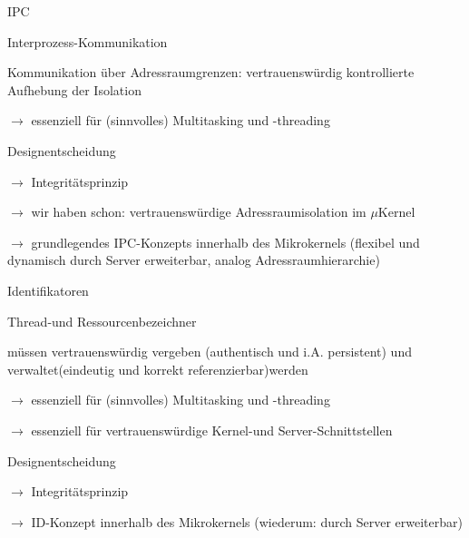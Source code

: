 \documentclass[a4paper]{article}
\begin{document}
\begin{multicols}{3}
    IPC

    \begin{itemize*}
        \item
        Interprozess-Kommunikation
        \begin{itemize*}
            \item Kommunikation über Adressraumgrenzen: vertrauenswürdig kontrollierte Aufhebung der Isolation
            \item $\rightarrow$  essenziell für (sinnvolles) Multitasking und -threading
        \end{itemize*}
        \item
        Designentscheidung
        \begin{itemize*}
            \item $\rightarrow$  Integritätsprinzip
            \item $\rightarrow$  wir haben schon: vertrauenswürdige Adressraumisolation im $\mu$Kernel
            \item $\rightarrow$  grundlegendes IPC-Konzepts innerhalb des Mikrokernels (flexibel und dynamisch durch Server erweiterbar, analog Adressraumhierarchie)
        \end{itemize*}
    \end{itemize*}

    Identifikatoren

    \begin{itemize*}
        \item
        Thread-und Ressourcenbezeichner
        \begin{itemize*}
            \item müssen vertrauenswürdig vergeben (authentisch und i.A. persistent) und verwaltet(eindeutig und korrekt referenzierbar)werden
            \item $\rightarrow$  essenziell für (sinnvolles) Multitasking und -threading
            \item $\rightarrow$  essenziell für vertrauenswürdige Kernel-und Server-Schnittstellen
        \end{itemize*}
        \item
        Designentscheidung
        \begin{itemize*}
            \item $\rightarrow$  Integritätsprinzip
            \item $\rightarrow$  ID-Konzept innerhalb des Mikrokernels (wiederum: durch Server erweiterbar)
        \end{itemize*}
    \end{itemize*}


\end{multicols}
\end{document}

